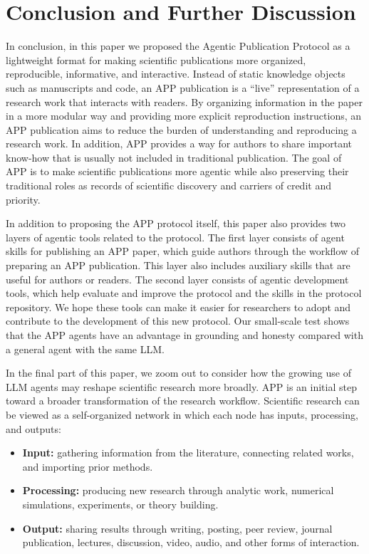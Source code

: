 \documentclass{article}
\begin{document}
\section{Conclusion and Further Discussion}\label{sec: further-discussion}

In conclusion, in this paper we proposed the Agentic Publication Protocol as a
lightweight format for making scientific publications more organized, reproducible, informative, and interactive. Instead of static knowledge objects such as manuscripts and code, an APP publication is a ``live'' representation of a research work that interacts with readers. By organizing information in the paper in a more modular way and providing more explicit reproduction instructions, an APP publication aims to reduce the burden of understanding and reproducing a research work. In addition, APP provides a way for authors to share important know-how that is usually not included in traditional publication. The goal of APP is to make scientific publications more agentic while also preserving their traditional roles as records of scientific discovery and carriers of credit and priority. 

In addition to proposing the APP protocol itself, this paper also provides two layers of agentic tools related to the protocol. The first layer consists of agent skills for publishing an APP paper, which guide authors through the workflow of preparing an APP publication. This layer also includes auxiliary skills that are useful for authors or readers. The second layer consists of agentic development tools, which help evaluate and improve the protocol and the skills in the protocol repository. We hope these tools can make it easier for researchers to adopt and contribute to the development of this new protocol. Our small-scale test shows that the
APP agents have an advantage in grounding and honesty compared with a general agent with the same LLM. 

In the final part of this paper, we zoom out to consider how the growing use of LLM agents may reshape scientific research more broadly. APP is an initial step toward a broader transformation of the research workflow. Scientific research can be viewed as a self-organized network in
which each node has inputs, processing, and outputs:
\begin{itemize}[leftmargin=2em]
    \item \textbf{Input:} gathering information from the literature, connecting
          related works, and importing prior methods.
    \item \textbf{Processing:} producing new research through analytic work,
          numerical simulations, experiments, or theory building.
    \item \textbf{Output:} sharing results through writing, posting, peer review,
          journal publication, lectures, discussion, video, audio, and other
          forms of interaction.
\end{itemize}
\end{document}
